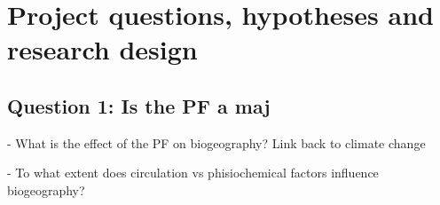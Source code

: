 \section{Project questions, hypotheses and research design}

\subsection{Question 1: Is the \ac{PF} a maj}

- What is the effect of the PF on biogeography? Link back to climate change

- To what extent does circulation vs phisiochemical factors influence biogeography?
